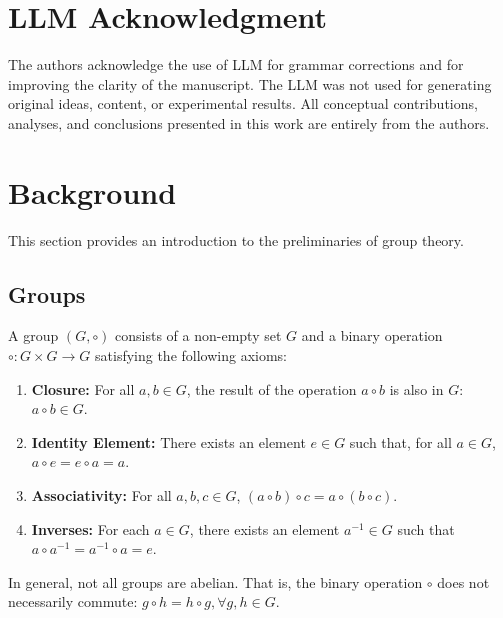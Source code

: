 \clearpage


\renewcommand{\contentsname}{\textsc{Appendices}}
\tableofcontents 


\clearpage
\section{LLM Acknowledgment}

The authors acknowledge the use of LLM for grammar corrections and for improving the clarity of the manuscript. The LLM was not used for generating original ideas, content, or experimental results. All conceptual contributions, analyses, and conclusions presented in this work are entirely from the authors.

\section{Background}

This section provides an introduction to the preliminaries of group theory. 

\subsection{Groups}
\label{sec:groups}
A group \( (G, \circ) \) consists of a non-empty set \( G \) and a binary operation \(\circ: G \times G \to G\) satisfying the following axioms:
\begin{enumerate}
    \item \textbf{Closure:} For all \( a, b \in G \), the result of the operation \( a \circ b \) is also in \( G \): \( a \circ b \in G \).
    \item \textbf{Identity Element:} There exists an element \( e \in G \) such that, for all \( a \in G \), \( a \circ e = e \circ a = a \).
    \item \textbf{Associativity:} For all \( a, b, c \in G \), \( (a \circ b) \circ c = a \circ (b \circ c) \).
    \item \textbf{Inverses:} For each \( a \in G \), there exists an element \( a^{-1} \in G \) such that \( a \circ a^{-1} = a^{-1} \circ a = e \).
\end{enumerate}

In general, not all groups are abelian. That is, the binary operation \(\circ\) does not necessarily commute:  
$
g \circ h = h \circ g,  \forall g,h \in G.
$

